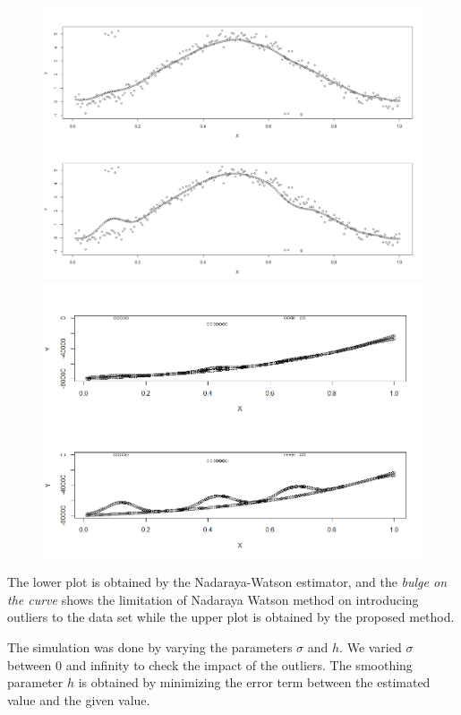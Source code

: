 \documentclass[11pt]{article}
\begin{document}
\begin{flushleft}
\begin{figure}[ht]
\begin{center}
\includegraphics[scale=0.2]{Rplot03}
\includegraphics[scale=0.36]{Rplot05}
\end{center}
\end{figure}
 
The lower plot is obtained by the Nadaraya-Watson estimator, and the {\it bulge on the curve} shows the limitation of Nadaraya Watson method on introducing outliers to the data set while the upper plot is obtained by the proposed method.

The simulation was done by varying the parameters $\sigma$ and $h$. We varied $\sigma$ between 0 and infinity to check the impact of the outliers. The smoothing parameter $h$ is obtained by minimizing the error term between the estimated value and the given value. 


\end{flushleft}
\end{document}
